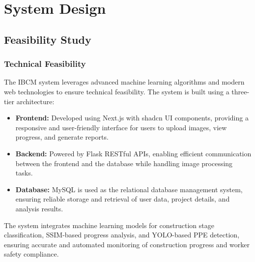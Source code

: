 
\chapter{System Design}

\section{Feasibility Study}

\subsection{Technical Feasibility}
The IBCM system leverages advanced machine learning algorithms and modern web technologies to ensure technical feasibility. The system is built using a three-tier architecture:
\begin{itemize}
    \item \textbf{Frontend:} Developed using Next.js with shadcn UI components, providing a responsive and user-friendly interface for users to upload images, view progress, and generate reports.
    \item \textbf{Backend:} Powered by Flask RESTful APIs, enabling efficient communication between the frontend and the database while handling image processing tasks.
    \item \textbf{Database:} MySQL is used as the relational database management system, ensuring reliable storage and retrieval of user data, project details, and analysis results.
\end{itemize}
The system integrates machine learning models for construction stage classification, SSIM-based progress analysis, and YOLO-based PPE detection, ensuring accurate and automated monitoring of construction progress and worker safety compliance.

